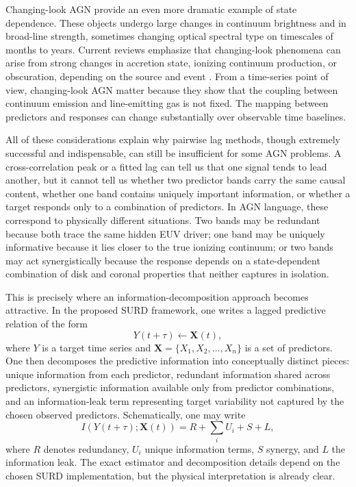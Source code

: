 \documentclass{article}
\begin{document}
Changing-look AGN provide an even more dramatic example of state dependence. These objects undergo large changes in continuum brightness and in broad-line strength, sometimes changing optical spectral type on timescales of months to years. Current reviews emphasize that changing-look phenomena can arise from strong changes in accretion state, ionizing continuum production, or obscuration, depending on the source and event \cite{RicciTrakhtenbrot2023}. From a time-series point of view, changing-look AGN matter because they show that the coupling between continuum emission and line-emitting gas is not fixed. The mapping between predictors and responses can change substantially over observable time baselines.

All of these considerations explain why pairwise lag methods, though extremely successful and indispensable, can still be insufficient for some AGN problems. A cross-correlation peak or a fitted lag can tell us that one signal tends to lead another, but it cannot tell us whether two predictor bands carry the same causal content, whether one band contains uniquely important information, or whether a target responds only to a combination of predictors. In AGN language, these correspond to physically different situations. Two bands may be redundant because both trace the same hidden EUV driver; one band may be uniquely informative because it lies closer to the true ionizing continuum; or two bands may act synergistically because the response depends on a state-dependent combination of disk and coronal properties that neither captures in isolation.

This is precisely where an information-decomposition approach becomes attractive. In the proposed SURD framework, one writes a lagged predictive relation of the form
\begin{equation}
Y(t+\tau)\leftarrow \mathbf{X}(t),
\label{eq:lagged_prediction}
\end{equation}
where \(Y\) is a target time series and \(\mathbf{X}=\{X_1,X_2,\dots,X_n\}\) is a set of predictors. One then decomposes the predictive information into conceptually distinct pieces: unique information from each predictor, redundant information shared across predictors, synergistic information available only from predictor combinations, and an information-leak term representing target variability not captured by the chosen observed predictors. Schematically, one may write
\begin{equation}
I\!\left(Y(t+\tau);\mathbf{X}(t)\right)
= R + \sum_i U_i + S + L,
\label{eq:surd_schematic}
\end{equation}
where \(R\) denotes redundancy, \(U_i\) unique information terms, \(S\) synergy, and \(L\) the information leak. The exact estimator and decomposition details depend on the chosen SURD implementation, but the physical interpretation is already clear.
\end{document}
